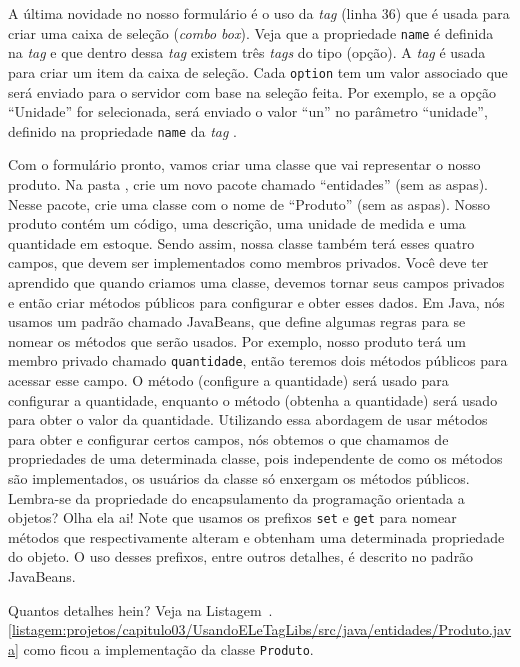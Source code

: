A última novidade no nosso formulário é o uso da \textit{tag}  (linha 36) que é usada para criar uma caixa de seleção (\textit{combo box}). Veja que a propriedade \texttt{name} é definida na \textit{tag}  e que dentro dessa \textit{tag} existem três \textit{tags} do tipo  (opção). A \textit{tag}  é usada para criar um item da caixa de seleção. Cada \texttt{option} tem um valor associado que será enviado para o servidor com base na seleção feita. Por exemplo, se a opção ``Unidade'' for selecionada, será enviado o valor ``un'' no parâmetro ``unidade'', definido na propriedade \texttt{name} da \textit{tag} .

Com o formulário pronto, vamos criar uma classe que vai representar o nosso produto. Na pasta , crie um novo pacote chamado ``entidades'' (sem as aspas). Nesse pacote, crie uma classe com o nome de ``Produto'' (sem as aspas). Nosso produto contém um código, uma descrição, uma unidade de medida e uma quantidade em estoque. Sendo assim, nossa classe também terá esses quatro campos, que devem ser implementados como membros privados. Você deve ter aprendido que quando criamos uma classe, devemos tornar seus campos privados e então criar métodos públicos para configurar e obter esses dados. Em Java, nós usamos um padrão chamado JavaBeans, que define algumas regras para se nomear os métodos que serão usados. Por exemplo, nosso produto terá um membro privado chamado \texttt{quantidade}, então teremos dois métodos públicos para acessar esse campo. O método  (configure a quantidade) será usado para configurar a quantidade, enquanto o método  (obtenha a quantidade) será usado para obter o valor da quantidade. Utilizando essa abordagem de usar métodos para obter e configurar certos campos, nós obtemos o que chamamos de propriedades de uma determinada classe, pois independente de como os métodos são implementados, os usuários da classe só enxergam os métodos públicos. Lembra-se da propriedade do encapsulamento da programação orientada a objetos? Olha ela ai! Note que usamos os prefixos \texttt{set} e \texttt{get} para nomear métodos que respectivamente alteram e obtenham uma determinada propriedade do objeto. O uso desses prefixos, entre outros detalhes, é descrito no padrão JavaBeans.

Quantos detalhes hein? Veja na Listagem~\thechapter.\ref{listagem:projetos/capitulo03/UsandoELeTagLibs/src/java/entidades/Produto.java} como ficou a implementação da classe \texttt{Produto}.

